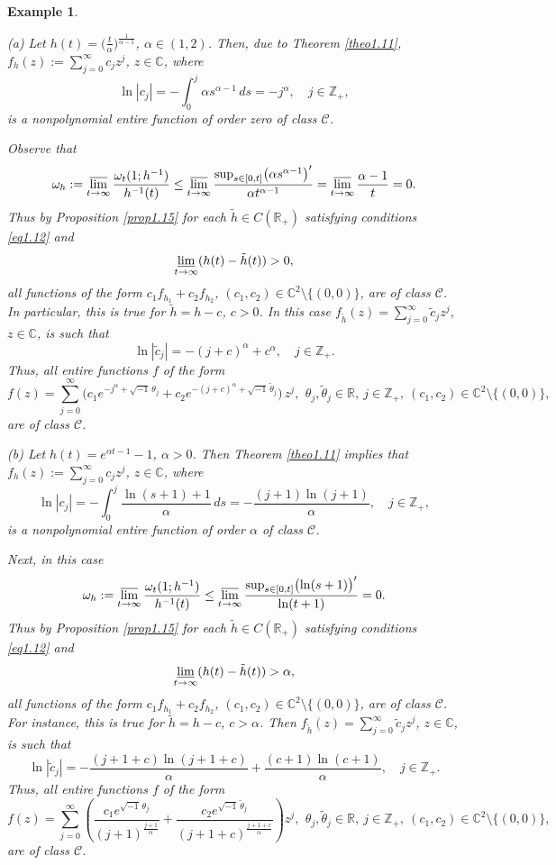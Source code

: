 \documentclass[11pt, oneside]{amsart}
\newtheorem{E}[Th]{Example}
\begin{document}
\begin{E}\label{ex1.15}
{\rm (a) Let $h(t)=\bigl(\frac{t}{\alpha}\bigr)^{\frac{1}{\alpha-1}}$, $\alpha\in (1,2)$. Then, due to Theorem \ref{theo1.11}, $f_h(z):=\sum_{j=0}^\infty c_j z^j$, $ z\in\mathbb C$, where
\[
\ln |c_j|=-\int_0^j \alpha s^{\alpha-1}\,ds=-j^\alpha,\quad j\in\mathbb Z_+,
\]
is a nonpolynomial entire function of order zero of class $\mathscr C$.

Observe that
\[
\omega_h:=\varlimsup_{t\rightarrow\infty}\frac{\omega_t(1;h^{-1})}{h^{-1}(t)}\le\varlimsup_{t\rightarrow\infty}\frac{\sup_{s\in [0,t]}\bigl(\alpha s^{\alpha-1}\bigr)' }{\alpha t^{\alpha-1}}=\varlimsup_{t\rightarrow\infty}\frac{\alpha-1}{t}=0.
\]
Thus by Proposition \ref{prop1.15} for each $\tilde h\in C(\mathbb R_+)$ satisfying conditions \eqref{eq1.12} and
\[
\varliminf_{t\rightarrow\infty}(h(t)-\tilde h(t))>0,
\]
all functions of the form $c_1f_{h_1}+c_2f_{h_2}$, $(c_1,c_2)\in\mathbb C^2\setminus\{(0,0)\}$, are of class $\mathscr C$. In particular, this is true for
$\tilde h=h-c$, $c>0$. In this case $f_{\tilde h}(z)=\sum_{j=0}^\infty \tilde c_j z^j$, $z\in\mathbb C$, is such that
\[
\ln |\tilde c_j|=-(j+c)^\alpha+ c^\alpha,\quad j\in\mathbb Z_+.
\]
Thus, all entire functions $f$ of the form
\[
f(z)=\sum_{j=0}^\infty \bigl( c_1e^{-j^\alpha +\sqrt{-1}\,\theta_j}+c_2 e^{-(j+c)^\alpha+\sqrt{-1}\,\tilde\theta_j}\bigr)\,z^j,\, \ \theta_j,\tilde\theta_j\in\mathbb R,\  j\in\mathbb Z_+,\  (c_1,c_2)\in\mathbb C^2\setminus\{(0,0)\},
\]
are of class $\mathscr C$.\smallskip

\noindent (b) Let $h(t)=e^{\alpha t-1}-1$, $\alpha>0$. Then Theorem \ref{theo1.11} implies that $f_h(z):=\sum_{j=0}^\infty c_j z^j$, $ z\in\mathbb C$, where
\[
\ln |c_j|=-\int_0^j \frac{\ln(s+1)+1}{\alpha}\,ds=-\frac{(j+1)\ln(j+1)}{\alpha},\quad j\in\mathbb Z_+,
\]
is a nonpolynomial entire function of order $\alpha$ of class $\mathscr C$.

Next, in this case
\[
\omega_h:=\varlimsup_{t\rightarrow\infty}\frac{\omega_t(1;h^{-1})}{h^{-1}(t)}\le\varlimsup_{t\rightarrow\infty}\frac{\sup_{s\in [0,t]}\bigl(\ln(s+1) \bigr)' }{\ln(t+1)}=0.
\]
Thus by Proposition \ref{prop1.15} for each $\tilde h\in C(\mathbb R_+)$ satisfying conditions \eqref{eq1.12} and
\[
\varliminf_{t\rightarrow\infty}(h(t)-\tilde h(t))>\alpha,
\]
all functions of the form $c_1f_{h_1}+c_2f_{h_2}$, $(c_1,c_2)\in\mathbb C^2\setminus\{(0,0)\}$, are of class $\mathscr C$. For instance, this is true for
$\tilde h=h-c$, $c>\alpha$. Then $f_{\tilde h}(z)=\sum_{j=0}^\infty \tilde c_j z^j$, $z\in\mathbb C$, is such that
\[
\ln |\tilde c_j|=-\frac{(j+1+c)\ln(j+1+c)}{\alpha}+\frac{(c+1)\ln(c+1)}{\alpha},\quad j\in\mathbb Z_+.
\]
Thus, all entire functions $f$ of the form
\[
f(z)=\sum_{j=0}^\infty \left(\frac{c_1e^{\sqrt{-1}\,\theta_j}}{(j+1)^{\frac{j+1}{\alpha}}}+\frac{c_2e^{\sqrt{-1}\,\tilde\theta_j}}{(j+1+c)^{\frac{j+1+c}{\alpha}}}\right)z^j,\, \ \theta_j,\tilde\theta_j\in\mathbb R,\  j\in\mathbb Z_+,\  (c_1,c_2)\in\mathbb C^2\setminus\{(0,0)\},
\]
are of class $\mathscr C$.
}
\end{E}
\end{document}
